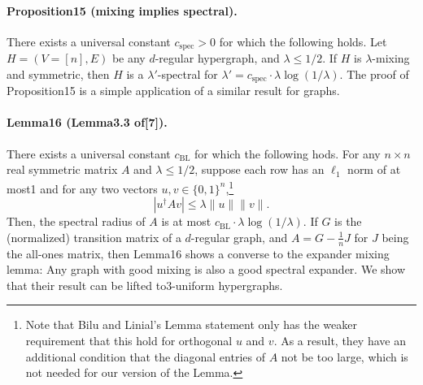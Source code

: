 \paragraph{Proposition15 (mixing implies spectral).} There exists a universal constant $c_{\mathrm{spec}}>0$ for which the following holds. Let $H=(V=[n],E)$ be any $d$-regular hypergraph, and $\lambda\leq1/2$. If $H$ is $\lambda$-mixing and symmetric, then $H$ is a $\lambda'$-spectral for $\lambda'=c_{\mathrm{spec}}\cdot\lambda\log(1/\lambda)$.
The proof of Proposition15 is a simple application of a similar result for graphs.
\paragraph{Lemma16 (Lemma3.3 of[7]).} There exists a universal constant $c_{\mathrm{BL}}$ for which the following hods. For any $n\times n$ real symmetric matrix $A$ and $\lambda\leq1/2$, suppose each row has an $\ell_1$ norm of at most1 and for any two vectors $u,v\in\{0,1\}^n$,\footnote{Note that Bilu and Linial's Lemma statement only has the weaker requirement that this hold for orthogonal $u$ and $v$. As a result, they have an additional condition that the diagonal entries of $A$ not be too large, which is not needed for our version of the Lemma.}
\[|u^{\dagger}Av|\leq\lambda\|u\|\|v\|.\tag{4}\]
Then, the spectral radius of $A$ is at most $c_{\mathrm{BL}}\cdot\lambda\log(1/\lambda)$.
If $G$ is the (normalized) transition matrix of a $d$-regular graph, and $A=G-\frac1nJ$ for $J$ being the all-ones matrix, then Lemma16 shows a converse to the expander mixing lemma: Any graph with good mixing is also a good spectral expander. We show that their result can be lifted to3-uniform hypergraphs.
